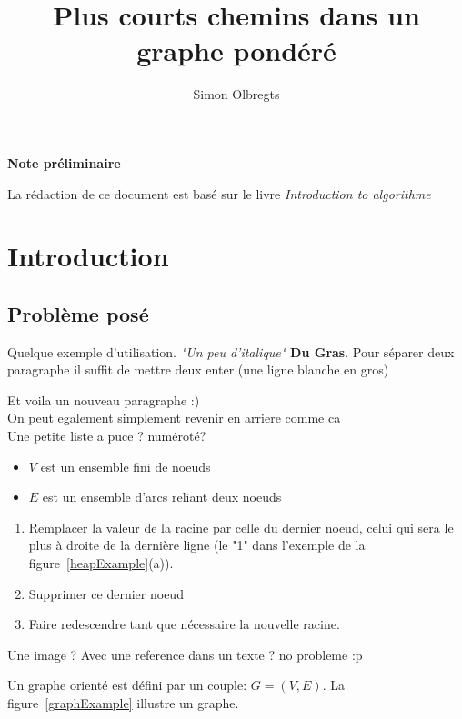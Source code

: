 \documentclass[12pt,a4paper,final]{article}
\author{Simon Olbregts}
\title{Plus courts chemins dans un graphe pondéré}
\newcommand{\smalltitle}[1]{\bigskip\large\textbf{#1}\par\normalsize\medskip}
\begin{document}
\umonsCoverPage
\pagebreak

\pagestyle{fancy}

\thispagestyle{empty}
\newpage
\tableofcontents
\newpage

\smalltitle{Note préliminaire}
La rédaction de ce document est basé sur le livre \textit{Introduction to algorithme}~\cite{intro_to_algo}

\section{Introduction}
\subsection{Problème posé}
Quelque exemple d'utilisation. \textit{"Un peu d'italique"} \textbf{Du Gras}. Pour séparer deux paragraphe il suffit de mettre deux enter (une ligne blanche en gros)

Et voila un nouveau paragraphe :)\\
On peut egalement simplement revenir en arriere comme ca \\

Une petite liste a puce ? numéroté?

\begin{itemize}
\item $V$ est un ensemble fini de noeuds
\item $E$ est un ensemble d'arcs reliant deux noeuds
\end{itemize}

\begin{enumerate}
\item Remplacer la valeur de la racine par celle du dernier noeud, celui qui sera le plus à droite de la dernière ligne (le "1" dans l'exemple de la figure~\ref{heapExample}(a)).
\item Supprimer ce dernier noeud
\item Faire redescendre tant que nécessaire la nouvelle racine.
\end{enumerate}
Une image ? Avec une reference dans un texte ? no probleme :p

Un graphe orienté est défini par un couple: $G=(V,E)$.
La figure~\ref{graphExample} illustre un graphe.
\end{document}
